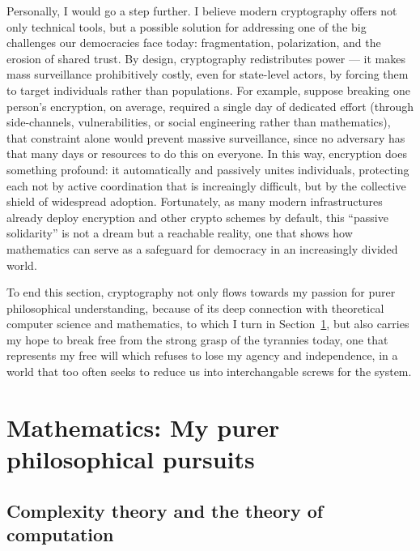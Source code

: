 \documentclass{article}
\begin{document}
Personally, I would go a step further. I believe modern cryptography offers not
only technical tools, but a possible solution for addressing one of the big
challenges our democracies face today: fragmentation, polarization, and the
erosion of shared trust. By design, cryptography redistributes power --- it
makes mass surveillance prohibitively costly, even for state-level actors, by
forcing them to target individuals rather than populations. For example,
suppose breaking one person’s encryption, on average, required a single day of
dedicated effort (through side-channels, vulnerabilities, or social engineering
rather than mathematics), that constraint alone would prevent massive
surveillance, since no adversary has that many days or resources to do this on
everyone. In this way, encryption does something profound: it automatically and
passively unites individuals, protecting each not by active coordination that
is increaingly difficult, but by the collective shield of widespread adoption.
Fortunately, as many modern infrastructures already deploy encryption and other
crypto schemes by default, this ``passive solidarity'' is not a dream but a
reachable reality, one that shows how mathematics can serve as a safeguard for
democracy in an increasingly divided world.

To end this section, cryptography not only flows towards my passion for purer
philosophical understanding, because of its deep connection with theoretical
computer science and mathematics, to which I turn in Section~\ref{sec.math},
but also carries my hope to break free from the strong grasp of the tyrannies
today, one that represents my free will which refuses to lose my agency and
independence, in a world that too often seeks to reduce us into interchangable
screws for the system.  

\section{Mathematics: My purer philosophical pursuits} \label{sec.math}

\subsection{Complexity theory and the theory of computation}




\end{document}
